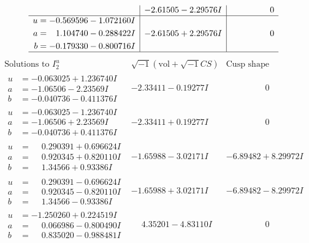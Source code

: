 \documentclass[1p]{elsarticle_modified}
\theoremstyle{definition}
\newcommand{\I}{\sqrt{-1}}
\begin{document}
$$\begin{array}{c|c|c}
 & -2.61505 - 2.29576 I & \phantom{-0.000000 } 0 \\ \hline\begin{aligned}
u &= -0.569596 - 1.072160 I \\
a &= \phantom{-}1.104740 - 0.288422 I \\
b &= -0.179330 - 0.800716 I\end{aligned}
 & -2.61505 + 2.29576 I & \phantom{-0.000000 } 0\\
 \hline 
 \end{array}$$\newpage$$\begin{array}{c|c|c}  
\text{Solutions to }I^u_{2}& \I (\text{vol} + \sqrt{-1}CS) & \text{Cusp shape}\\
 \hline 
\begin{aligned}
u &= -0.063025 + 1.236740 I \\
a &= -1.06506 - 2.23569 I \\
b &= -0.040736 - 0.411376 I\end{aligned}
 & -2.33411 - 0.19277 I & \phantom{-0.000000 } 0 \\ \hline\begin{aligned}
u &= -0.063025 - 1.236740 I \\
a &= -1.06506 + 2.23569 I \\
b &= -0.040736 + 0.411376 I\end{aligned}
 & -2.33411 + 0.19277 I & \phantom{-0.000000 } 0 \\ \hline\begin{aligned}
u &= \phantom{-}0.290391 + 0.696624 I \\
a &= \phantom{-}0.920345 + 0.820110 I \\
b &= \phantom{-}1.34566 + 0.93386 I\end{aligned}
 & -1.65988 - 3.02171 I & -6.89482 + 8.29972 I \\ \hline\begin{aligned}
u &= \phantom{-}0.290391 - 0.696624 I \\
a &= \phantom{-}0.920345 - 0.820110 I \\
b &= \phantom{-}1.34566 - 0.93386 I\end{aligned}
 & -1.65988 + 3.02171 I & -6.89482 - 8.29972 I \\ \hline\begin{aligned}
u &= -1.250260 + 0.224519 I \\
a &= \phantom{-}0.066986 - 0.800490 I \\
b &= \phantom{-}0.835020 - 0.988481 I\end{aligned}
 & \phantom{-}4.35201 - 4.83110 I & \phantom{-0.000000 } 0 \\ \hline\begin{aligned}

\end{aligned}
\end{array}$$
\end{document}
